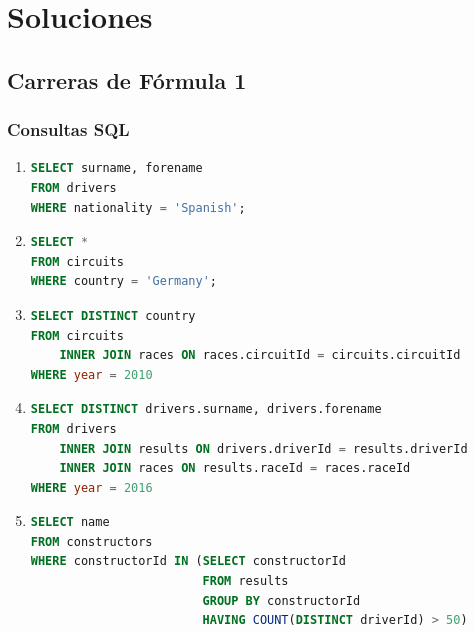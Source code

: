 \documentclass{db-practice}
\begin{document}
\section{Soluciones}

\subsection*{Carreras de Fórmula 1}

\subsubsection*{Consultas SQL}

\begin{enumerate}

\item 
\begin{lstlisting}[language=SQL]
SELECT surname, forename
FROM drivers 
WHERE nationality = 'Spanish';
\end{lstlisting}

\item 
\begin{lstlisting}[language=SQL]
SELECT *
FROM circuits 
WHERE country = 'Germany';
\end{lstlisting}

\item
\begin{lstlisting}[language=SQL]
SELECT DISTINCT country
FROM circuits
    INNER JOIN races ON races.circuitId = circuits.circuitId
WHERE year = 2010
\end{lstlisting}

\item
\begin{lstlisting}[language=SQL]
SELECT DISTINCT drivers.surname, drivers.forename
FROM drivers 
    INNER JOIN results ON drivers.driverId = results.driverId
    INNER JOIN races ON results.raceId = races.raceId
WHERE year = 2016
\end{lstlisting}

\item
\begin{lstlisting}[language=SQL]
SELECT name
FROM constructors
WHERE constructorId IN (SELECT constructorId
                        FROM results
                        GROUP BY constructorId
                        HAVING COUNT(DISTINCT driverId) > 50)
\end{lstlisting}


\end{enumerate}
\end{document}
